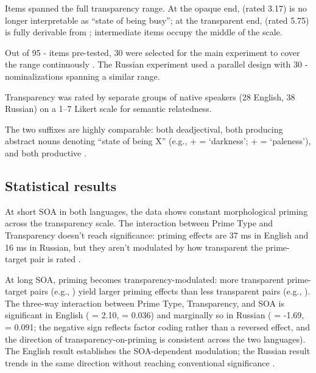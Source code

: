 Items spanned the full transparency range. At the opaque end,  (rated 3.17) is no longer interpretable as \enquote{state of being busy}; at the transparent end,  (rated 5.75) is fully derivable from ; intermediate items occupy the middle of the scale.

Out of 95 - items pre-tested, 30 were selected for the main experiment to cover the range continuously \autocite[1115]{heyer-kornishova-2018-priming-eventually}. The Russian experiment used a parallel design with 30 - nominalizations spanning a similar range.

Transparency was rated by separate groups of native speakers (28 English, 38 Russian) on a 1--7 Likert scale for semantic relatedness.

The two suffixes are highly comparable: both deadjectival, both producing abstract nouns denoting \enquote{state of being X} (e.g.,  +  = `darkness';  +  =  `paleness'), and both productive \autocite[1115]{heyer-kornishova-2018-priming-eventually}.

\subsection{Statistical results}\label{sec:C-3}

At short SOA in both languages, the data shows constant morphological priming across the transparency scale. The interaction between Prime Type and Transparency doesn't reach significance: priming effects are 37 ms in English and 16 ms in Russian, but they aren't modulated by how transparent the prime-target pair is rated \autocite[1117--1119]{heyer-kornishova-2018-priming-eventually}.

At long SOA, priming becomes transparency-modulated: more transparent prime-target pairs (e.g., ) yield larger priming effects than less transparent pairs (e.g., ). The three-way interaction between Prime Type, Transparency, and SOA is significant in English ( = 2.10,  = 0.036) and marginally so in Russian ( = -1.69,  = 0.091; the negative sign reflects factor coding rather than a reversed effect, and the direction of transparency-on-priming is consistent across the two languages). The English result establishes the SOA-dependent modulation; the Russian result trends in the same direction without reaching conventional significance \autocite[1117--1119]{heyer-kornishova-2018-priming-eventually}.

